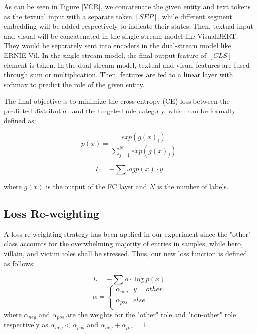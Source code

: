 \documentclass[11pt]{article}
\begin{document}
As can be seen in Figure \ref{VCR}, we concatenate the given entity and text tokens as the textual input with a separate token $[SEP]$, while different segment embedding will be added respectively to indicate their states. Then, textual input and visual will be concatenated in the single-stream model like VisualBERT. They would be separately sent into encoders in the dual-stream model like ERNIE-Vil. In the single-stream model, the final output feature of $[CLS]$ element is taken. In the dual-stream model, textual and visual features are fused through sum or multiplication. Then, features are fed to a linear layer with softmax to predict the role of the given entity. 

The final objective is to minimize the cross-entropy (CE) loss between the predicted distribution and the targeted role category, which can be formally defined as:

\begin{small}
\begin{equation}
    p(x) = \frac{exp(g(x)_i)}{\sum_{j=1}^N exp(g(x)_j)}
\end{equation}

\begin{equation}
    L = - \sum log{p(x)} \cdot y
\end{equation}
\end{small}

where $g(x)$ is the output of the FC layer and $N$ is the number of labels.

\subsection{Loss Re-weighting}
A loss re-weighting strategy has been applied in our experiment since the "other" class accounts for the overwhelming majority of entries in samples, while hero, villain, and victim roles shall be stressed. Thus, our new loss function is defined as follows:


\begin{equation}
L = - \sum \alpha  \cdot  \log{p(x)}
\end{equation}
 \begin{equation}
  \alpha = \begin{cases} \alpha_{neg} & y = other \\ \alpha_{pos} & else\\ \end{cases} 
 \end{equation}
where $\alpha_{neg}$ and $\alpha_{pos}$ are the weights for the "other" role and "non-other" role respectively as $\alpha_{neg}$ < $\alpha_{pos}$ and $\alpha_{neg} + \alpha_{pos} = 1$. 
\end{document}
